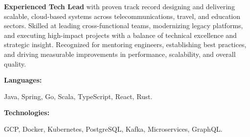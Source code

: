 \documentclass[9pt]{developercv} %
\newif\ifmanager
\begin{document}
    \begin{minipage}[t]{0.46\textwidth}
        \vspace{-6pt}
        \begin{flushleft}
            \ifmanager
                \textbf{Engineering Manager and Technical Leader} with proven track record building high-performing teams and delivering scalable systems across travel, education, and telecommunications sectors.
                Experienced managing direct reports, driving cross-functional collaboration, and balancing technical direction with people development.
                Skilled at mentoring engineers, establishing best practices, modernizing legacy platforms, and executing strategic initiatives that align technical decisions with business outcomes.
            \else
                \textbf{Experienced Tech Lead} with proven track record designing and delivering scalable, cloud-based systems across telecommunications, travel, and education sectors.
                Skilled at leading cross-functional teams, modernizing legacy platforms, and executing high-impact projects with a balance of technical excellence and strategic insight.
                Recognized for mentoring engineers, establishing best practices, and driving measurable improvements in performance, scalability, and overall quality.
            \fi
        \end{flushleft}
    \end{minipage}
    \hfill %
    \begin{minipage}[t]{0.465\textwidth}
        \vspace{-6pt}

        \begin{minipage}[t]{0.2\textwidth}
            \textbf{Languages:}
        \end{minipage}
        \hfill
        \begin{minipage}[t]{0.73\textwidth}
            Java, Spring, Go, Scala, TypeScript, React, Rust.
        \end{minipage}
        \vspace{4mm}

        \begin{minipage}[t]{0.2\textwidth}
            \textbf{Technologies:}
        \end{minipage}
        \hfill
        \begin{minipage}[t]{0.73\textwidth}
            GCP, Docker, Kubernetes, PostgreSQL, Kafka, Microservices, GraphQL.
        \end{minipage}

    \end{minipage}
\end{document}
